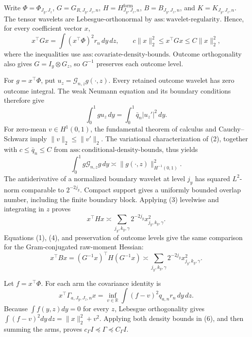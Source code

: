 Write \(\Phi=\Phi_{J_y,J_z}\), \(G=G_{R,J_y,J_z,n}\), \(H=H^{\mathrm{form}}_{J_y,J_z,n}\), \(B=B_{J_y,J_z,n}\), and \(K=K_{J_y,J_z,n}\). The tensor wavelets are Lebesgue-orthonormal by \(\mathrm{ass{:}wavelet\text{-}regularity}\). Hence, for every coefficient vector \(x\),
\[
x^\top Gx=\int(x^\top\Phi)^2r_n\,dy\,dz,
\qquad c\|x\|_2^2\le x^\top Gx\le C\|x\|_2^2,                 \tag{1}
\]
where the inequalities use \(\mathrm{ass{:}covariate\text{-}density\text{-}bounds}\). Outcome orthogonality also gives \(G=I_y\otimes G_z\), so \(G^{-1}\) preserves each outcome level.

For \(g=x^\top\Phi\), put \(u_z=\mathcal G_{n,z}g(\cdot,z)\). Every retained outcome wavelet has zero outcome integral. The weak Neumann equation and its boundary conditions therefore give
\[
\int_0^1g u_z\,dy=\int_0^1\bar q_n|u_z'|^2\,dy.                    \tag{2}
\]
For zero-mean \(v\in H^1(0,1)\), the fundamental theorem of calculus and Cauchy--Schwarz imply \(\|v\|_2\le\|v'\|_2\). The variational characterization of (2), together with \(c\le\bar q_n\le C\) from \(\mathrm{ass{:}conditional\text{-}density\text{-}bounds}\), thus yields
\[
\int_0^1g\mathcal G_{n,z}g\,dy\asymp\|g(\cdot,z)\|_{H^{-1}(0,1)}^2. \tag{3}
\]
The antiderivative of a normalized boundary wavelet at level \(j_y\) has squared \(L^2\)-norm comparable to \(2^{-2j_y}\). Compact support gives a uniformly bounded overlap number, including the finite boundary block. Applying (3) levelwise and integrating in \(z\) proves
\[
x^\top Hx\asymp\sum_{j_y,k_y,\gamma}2^{-2j_y}x_{j_y,k_y,\gamma}^2. \tag{4}
\]
Equations (1), (4), and preservation of outcome levels give the same comparison for the Gram-conjugated raw-moment Hessian:
\[
x^\top Bx=(G^{-1}x)^\top H(G^{-1}x)
\asymp\sum_{j_y,k_y,\gamma}2^{-2j_y}x_{j_y,k_y,\gamma}^2.          \tag{5}
\]

Let \(f=x^\top\Phi\). For each arm the covariance identity is
\[
x^\top\Gamma_{a,J_y,J_z,n}x
=\inf_{v\in\mathbb R}\int(f-v)^2q_{a,n}r_n\,dy\,dz.                \tag{6}
\]
Because \(\int f(y,z)dy=0\) for every \(z\), Lebesgue orthogonality gives \(\int(f-v)^2dy\,dz=\|x\|_2^2+v^2\). Applying both density bounds in (6), and then summing the arms, proves \(c_\Gamma I\preceq\Gamma\preceq C_\Gamma I\).

